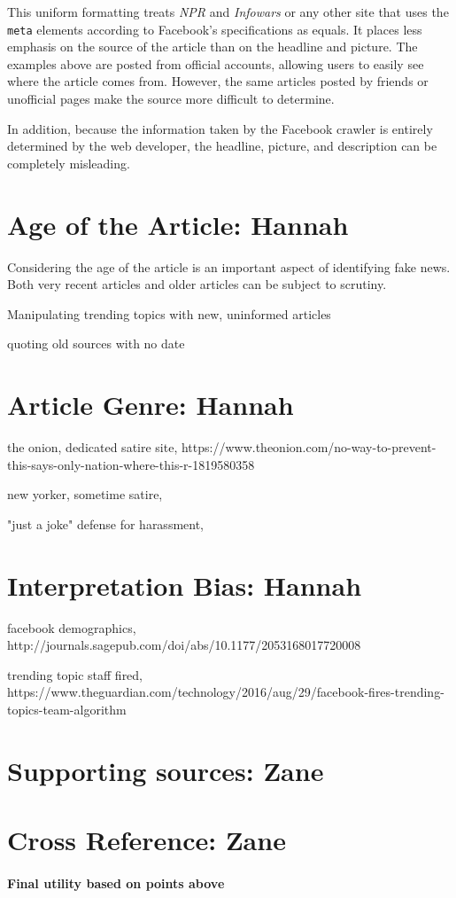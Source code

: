 \documentclass[12pt]{article}
\begin{document}
This uniform formatting treats {\it NPR} and {\it Infowars} or any other site that uses the \texttt{meta} elements according to Facebook's specifications as equals. It places less emphasis on the source of the article than on the headline and picture. The examples above are posted from official accounts, allowing users to easily see where the article comes from. However, the same articles posted by friends or unofficial pages make the source more difficult to determine.

In addition, because the information taken by the Facebook crawler is entirely determined by the web developer, the headline, picture, and description can be completely misleading.






\section{Age of the Article: Hannah}
Considering the age of the article is an important aspect of identifying fake news. Both very recent articles and older articles can be subject to scrutiny.

Manipulating trending topics with new, uninformed articles

quoting old sources with no date



\section{Article Genre: Hannah}

the onion, dedicated satire site, https://www.theonion.com/no-way-to-prevent-this-says-only-nation-where-this-r-1819580358

new yorker, sometime satire, 

"just a joke" defense for harassment, 



\section{Interpretation Bias: Hannah}

facebook demographics, http://journals.sagepub.com/doi/abs/10.1177/2053168017720008

trending topic staff fired, https://www.theguardian.com/technology/2016/aug/29/facebook-fires-trending-topics-team-algorithm


\section{Supporting sources: Zane}


\section{Cross Reference: Zane}



\paragraph{Final utility based on points above}

\newpage


\end{document}
